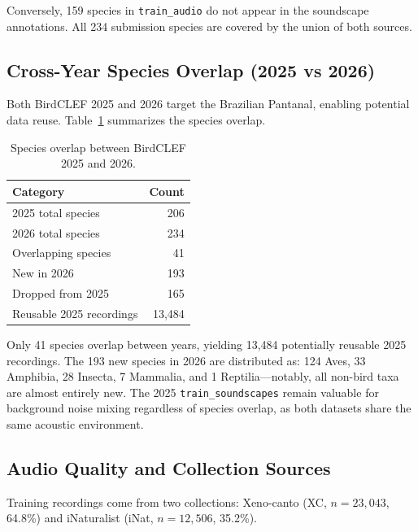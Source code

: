 Conversely, 159 species in \texttt{train\_audio} do not appear in the soundscape annotations.
All 234 submission species are covered by the union of both sources.

\subsection{Cross-Year Species Overlap (2025 vs 2026)}
\label{sec:eda:overlap}

Both BirdCLEF 2025 and 2026 target the Brazilian Pantanal, enabling potential data reuse.
Table~\ref{tab:overlap} summarizes the species overlap.

\begin{table}[h]
\centering
\caption{Species overlap between BirdCLEF 2025 and 2026.}
\label{tab:overlap}
\begin{tabular}{lr}
\hline
\textbf{Category} & \textbf{Count} \\
\hline
2025 total species          & 206 \\
2026 total species          & 234 \\
Overlapping species         &  41 \\
New in 2026                 & 193 \\
Dropped from 2025           & 165 \\
Reusable 2025 recordings    & 13{,}484 \\
\hline
\end{tabular}
\end{table}

Only 41 species overlap between years, yielding 13{,}484 potentially reusable 2025 recordings.
The 193 new species in 2026 are distributed as:
124 Aves, 33 Amphibia, 28 Insecta, 7 Mammalia, and 1 Reptilia---notably, all
non-bird taxa are almost entirely new.
The 2025 \texttt{train\_soundscapes} remain valuable for background noise mixing
regardless of species overlap, as both datasets share the same acoustic environment.

\subsection{Audio Quality and Collection Sources}
\label{sec:eda:quality}

Training recordings come from two collections:
Xeno-canto (XC, $n=23{,}043$, 64.8\%) and iNaturalist (iNat, $n=12{,}506$, 35.2\%).

